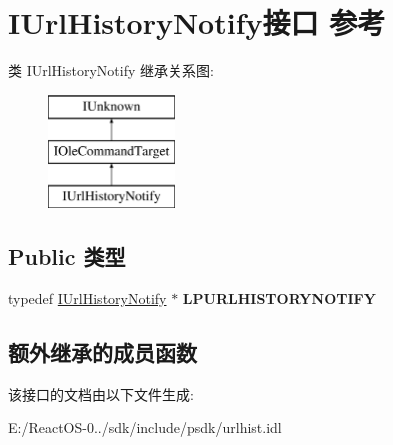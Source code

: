 \hypertarget{interface_i_url_history_notify}{}\section{I\+Url\+History\+Notify接口 参考}
\label{interface_i_url_history_notify}
类 I\+Url\+History\+Notify 继承关系图\+:\begin{figure}[H]
\begin{center}
\leavevmode
\includegraphics[height=3.000000cm]{interface_i_url_history_notify}
\end{center}
\end{figure}
\subsection*{Public 类型}
\begin{DoxyCompactItemize}
\item 
\mbox{\label{interface_i_url_history_notify_ac9b74fd677d99db2e4ce28ae593cad25}} 
typedef \hyperlink{interface_i_url_history_notify}{I\+Url\+History\+Notify} $\ast$ {\bfseries L\+P\+U\+R\+L\+H\+I\+S\+T\+O\+R\+Y\+N\+O\+T\+I\+FY}
\end{DoxyCompactItemize}
\subsection*{额外继承的成员函数}


该接口的文档由以下文件生成\+:\begin{DoxyCompactItemize}
\item 
E\+:/\+React\+O\+S-\/0../sdk/include/psdk/urlhist.\+idl\end{DoxyCompactItemize}
